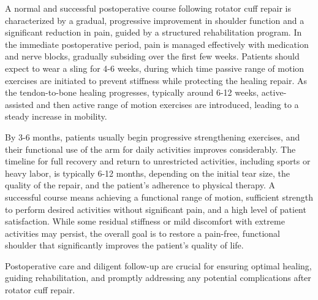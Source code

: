 A normal and successful postoperative course following rotator cuff repair is characterized by a gradual, progressive improvement in shoulder function and a significant reduction in pain, guided by a structured rehabilitation program. In the immediate postoperative period, pain is managed effectively with medication and nerve blocks, gradually subsiding over the first few weeks. Patients should expect to wear a sling for 4-6 weeks, during which time passive range of motion exercises are initiated to prevent stiffness while protecting the healing repair. As the tendon-to-bone healing progresses, typically around 6-12 weeks, active-assisted and then active range of motion exercises are introduced, leading to a steady increase in mobility.

By 3-6 months, patients usually begin progressive strengthening exercises, and their functional use of the arm for daily activities improves considerably. The timeline for full recovery and return to unrestricted activities, including sports or heavy labor, is typically 6-12 months, depending on the initial tear size, the quality of the repair, and the patient's adherence to physical therapy. A successful course means achieving a functional range of motion, sufficient strength to perform desired activities without significant pain, and a high level of patient satisfaction. While some residual stiffness or mild discomfort with extreme activities may persist, the overall goal is to restore a pain-free, functional shoulder that significantly improves the patient's quality of life.

Postoperative care and diligent follow-up are crucial for ensuring optimal healing, guiding rehabilitation, and promptly addressing any potential complications after rotator cuff repair.

